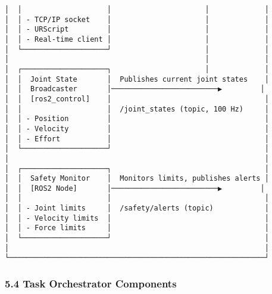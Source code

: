 \documentclass[
]{article}
\begin{document}
\begin{verbatim}
│  │                    │                      │             │
│  │ - TCP/IP socket    │                      │             │
│  │ - URScript         │                      │             │
│  │ - Real-time client │                      │             │
│  └────────────────────┘                      │             │
│                                              │             │
│  ┌────────────────────┐                      │             │
│  │  Joint State       │  Publishes current joint states    │
│  │  Broadcaster       │─────────────────────────▶         │
│  │  [ros2_control]    │                                    │
│  │                    │  /joint_states (topic, 100 Hz)     │
│  │ - Position         │                                    │
│  │ - Velocity         │                                    │
│  │ - Effort           │                                    │
│  └────────────────────┘                                    │
│                                                            │
│  ┌────────────────────┐                                    │
│  │  Safety Monitor    │  Monitors limits, publishes alerts │
│  │  [ROS2 Node]       │─────────────────────────▶         │
│  │                    │                                    │
│  │ - Joint limits     │  /safety/alerts (topic)            │
│  │ - Velocity limits  │                                    │
│  │ - Force limits     │                                    │
│  └────────────────────┘                                    │
│                                                            │
└────────────────────────────────────────────────────────────┘
\end{verbatim}

\hypertarget{task-orchestrator-components}{%
\subsubsection{5.4 Task Orchestrator
Components}\label{task-orchestrator-components}}
\end{document}
